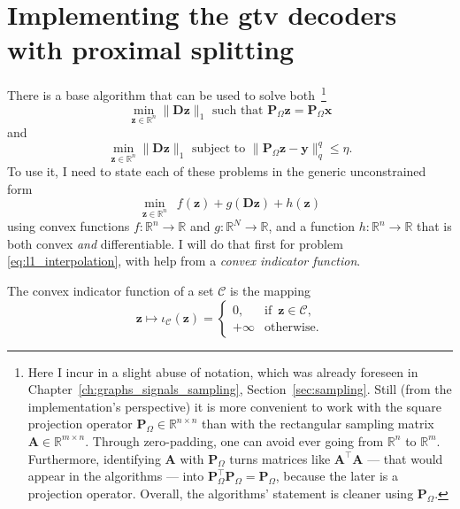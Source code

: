 \section{Implementing the \texorpdfstring{\acrshort{gtv}}{G-TV} decoders with proximal splitting}

There is a base algorithm that can be used to solve both~\footnote{Here I incur in a slight abuse of notation, which was already foreseen in Chapter~\ref{ch:graphs_signals_sampling}, Section~\ref{sec:sampling}. Still (from the implementation's perspective) it is more convenient to work with the square projection operator $\mathbf{P}_{\Omega} \in \mathbb{R}^{n \times n}$ than with the rectangular sampling matrix $\mathbf{A} \in \mathbb{R}^{m \times n}$. Through zero-padding, one can avoid ever going from $\mathbb{R}^{n}$ to $\mathbb{R}^{m}$. Furthermore, identifying $\mathbf{A}$ with $\mathbf{P}_{\Omega}$ turns matrices like $\mathbf{A}^\top \mathbf{A}$ --- that would appear in the algorithms --- into $\mathbf{P}_{\Omega}^\top \mathbf{P}_{\Omega} = \mathbf{P}_{\Omega}$, because the later is a projection operator. Overall, the algorithms' statement is cleaner using $\mathbf{P}_{\Omega}$.}
\begin{equation}
    \underset{\mathbf{z} \in \mathbb{R}^{n}}{\min} \| \mathbf{D z} \|_1 \text{ such that } \mathbf{P}_{\Omega}\mathbf{z} = \mathbf{P}_{\Omega}\mathbf{x} \tag{P1}
\end{equation}
and
\begin{equation}
    \underset{\mathbf{z} \in \mathbb{R}^{n}}{\min}  \| \mathbf{D z} \|_1 \text{ subject to } \| \mathbf{P}_{\Omega}\mathbf{z} - \mathbf{y} \|_q^q \leq \eta \tag{P1-$\eta$}.
\end{equation}
To use it, I need to state each of these problems in the generic unconstrained form
\begin{equation}\label{eq:standard_primal_dual}
    \underset{\mathbf{z} \in \mathbb{R}^{n}}{\min} \enspace f(\mathbf{z}) + g(\mathbf{Dz}) + h(\mathbf{z})
\end{equation}
using convex functions $f: \mathbb{R}^{n} \to \mathbb{R}$ and $g: \mathbb{R}^{N} \to \mathbb{R}$, and a function $h: \mathbb{R}^{n} \to \mathbb{R}$ that is both convex \emph{and} differentiable. I will do that first for problem \eqref{eq:l1_interpolation}, with help from a \emph{convex indicator function}.

\begin{definition}
    The convex indicator function of a set $\mathcal{C}$ is the mapping
    \begin{equation}
        \mathbf{z} \mapsto \iota_{\mathcal{C}}(\mathbf{z}) = \left \{
            \begin{matrix}
                0, & \text{if} \enspace \mathbf{z} \in \mathcal{C}, \\
                +\infty & \text{otherwise}.
            \end{matrix}
        \right.
    \end{equation}
\end{definition}


